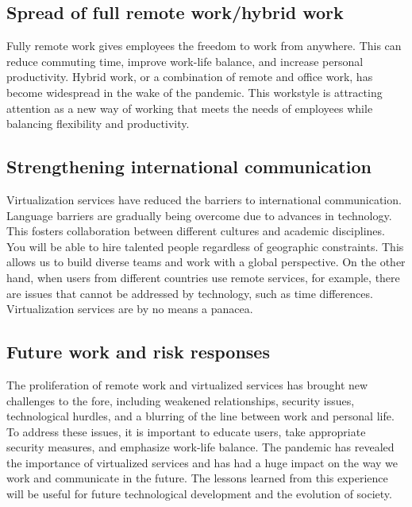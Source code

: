 \documentclass[12pt]{article}
\begin{document}
\subsection{Spread of full remote work/hybrid work}
Fully remote work gives employees the freedom to work from anywhere. This can
reduce commuting time, improve work-life balance, and increase personal
productivity. Hybrid work, or a combination of remote and office work, has
become widespread in the wake of the pandemic. This workstyle is attracting
attention as a new way of working that meets the needs of employees while
balancing flexibility and productivity.

\subsection{Strengthening international communication}
Virtualization services have reduced the barriers to international
communication. Language barriers are gradually being overcome due to advances
in technology. This fosters collaboration between different cultures and
academic disciplines. You will be able to hire talented people regardless of
geographic constraints. This allows us to build diverse teams and work with a
global perspective. On the other hand, when users from different countries use
remote services, for example, there are issues that cannot be addressed by
technology, such as time differences. Virtualization services are by no means a
panacea.

\subsection{Future work and risk responses}
The proliferation of remote work and virtualized services has brought new
challenges to the fore, including weakened relationships, security issues,
technological hurdles, and a blurring of the line between work and personal
life. To address these issues, it is important to educate users, take
appropriate security measures, and emphasize work-life balance. The pandemic
has revealed the importance of virtualized services and has had a huge impact
on the way we work and communicate in the future. The lessons learned from this
experience will be useful for future technological development and the
evolution of society.



\end{document}
